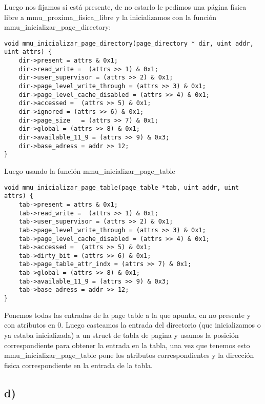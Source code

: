 Luego nos fijamos si está presente, de no estarlo le pedimos una página física libre a mmu\_proxima\_fisica\_libre y la inicializamos con la función mmu\_inicializar\_page\_directory:
\begin{codesnippet}
\begin{verbatim}
void mmu_inicializar_page_directory(page_directory * dir, uint addr, uint attrs) {
    dir->present = attrs & 0x1;
    dir->read_write =  (attrs >> 1) & 0x1;
    dir->user_supervisor = (attrs >> 2) & 0x1;                  
    dir->page_level_write_through = (attrs >> 3) & 0x1;
    dir->page_level_cache_disabled = (attrs >> 4) & 0x1;
    dir->accessed =  (attrs >> 5) & 0x1;
    dir->ignored = (attrs >> 6) & 0x1;
    dir->page_size   = (attrs >> 7) & 0x1;             
    dir->global = (attrs >> 8) & 0x1;
    dir->available_11_9 = (attrs >> 9) & 0x3;
    dir->base_adress = addr >> 12;
}
\end{verbatim}
\end{codesnippet}
\noindent Luego usando la función mmu\_inicializar\_page\_table
\begin{codesnippet}
\begin{verbatim}
void mmu_inicializar_page_table(page_table *tab, uint addr, uint attrs) {
    tab->present = attrs & 0x1;
    tab->read_write =  (attrs >> 1) & 0x1;
    tab->user_supervisor = (attrs >> 2) & 0x1;                  
    tab->page_level_write_through = (attrs >> 3) & 0x1;
    tab->page_level_cache_disabled = (attrs >> 4) & 0x1;
    tab->accessed =  (attrs >> 5) & 0x1;
    tab->dirty_bit = (attrs >> 6) & 0x1;
    tab->page_table_attr_indx = (attrs >> 7) & 0x1;             
    tab->global = (attrs >> 8) & 0x1;
    tab->available_11_9 = (attrs >> 9) & 0x3;
    tab->base_adress = addr >> 12;
}
\end{verbatim}
\end{codesnippet}
 \noindent Ponemos todas las entradas de la page table a la que apunta, en no presente y con atributos en 0. Luego casteamos la entrada del directorio (que inicializamos o ya estaba inicializada) a un struct de tabla de pagina y usamos
 la posición correspondiente para obtener la entrada en la tabla, una vez que tenemos esto mmu\_inicializar\_page\_table pone los atributos correspondientes y la dirección fisica correspondiente en la entrada de la tabla.

\subsection*{d)}

